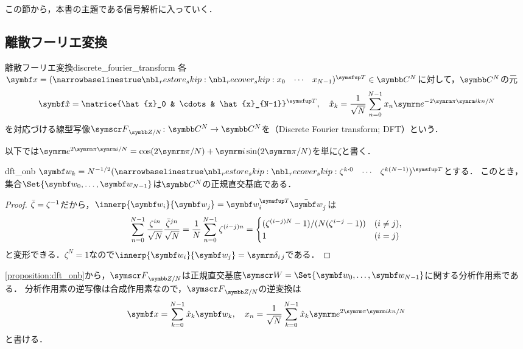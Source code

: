 \documentclass[../../main]{subfiles}
\begin{document}
この節から，本書の主題である信号解析に入っていく．

\subsection{離散フーリエ変換}

\begin{definition}{離散フーリエ変換}{discrete_fourier_transform}
  各\(\vect{x}=\trps{\rowvect{x_0 & \cdots & x_{N-1}}}\in\numset{C}^N\)に対して，\(\numset{C}^N\)の元
  \[
    \vect{\hat{x}} = \trps{\matrice{\hat{x}_0 & \cdots & \hat{x}_{N-1}}},
    \quad\hat{x}_k = \frac{1}{\sqrt{N}}\sum_{n=0}^{N-1}x_n\napr^{-2\krez\iuni kn/N}
  \]
  を対応づける線型写像\(\dft{N}\colon\numset{C}^N\to\numset{C}^N\)を（Discrete Fourier transform; DFT）という．
\end{definition}

以下では\(\napr^{2\krez\iuni/N}=\cos(2\krez/N)+\iuni\sin(2\krez/N)\)を単に\(\zeta\)と書く．

\begin{proposition}{}{dft_onb}
  \(\vect{w}_k=N^{-1/2}\trps{\rowvect{\zeta^{k\cdot 0} & \cdots & \zeta^{k(N-1)}}}\)とする．
  このとき，集合\(\Set{\vect{w}_0,\dots,\vect{w}_{N-1}}\)は\(\numset{C}^N\)の正規直交基底である．
\end{proposition}

\begin{proof}
  \(\conj{\zeta}=\zeta^{-1}\)だから，\(\innerp{\vect{w}_i}{\vect{w}_j}=\trps{\vect{w}_i}\conj{\vect{w}}_j\)は
  \[
    \sum_{n=0}^{N-1}\frac{\zeta^{in}}{\sqrt{N}}\frac{\conj{\zeta}^{jn}}{\sqrt{N}} = \frac{1}{N}\sum_{n=0}^{N-1}\zeta^{(i-j)n}
    = \begin{cases}(\zeta^{(i-j)N}-1)/(N(\zeta^{i-j}-1)) & (i\neq j), \\ 1 & (i=j)\end{cases}
  \]
  と変形できる．\(\zeta^N=1\)なので\(\innerp{\vect{w}_i}{\vect{w}_j}=\kdelta{i}{j}\)である．
\end{proof}

\cref{proposition:dft_onb}から，\(\dft{N}\)は正規直交基底\(\basis{W}=\Set{\vect{w}_0,\dots,\vect{w}_{N-1}}\)に関する分析作用素である．
分析作用素の逆写像は合成作用素なので，\(\dft{N}\)の逆変換は
\begin{equation}
  \label{equation:idft}
  \vect{x} = \sum_{k=0}^{N-1}\hat{x}_k\vect{w}_k,
  \quad x_n = \frac{1}{\sqrt{N}}\sum_{k=0}^{N-1}\hat{x}_k\napr^{2\krez\iuni kn/N}
\end{equation}
と書ける．
\end{document}
